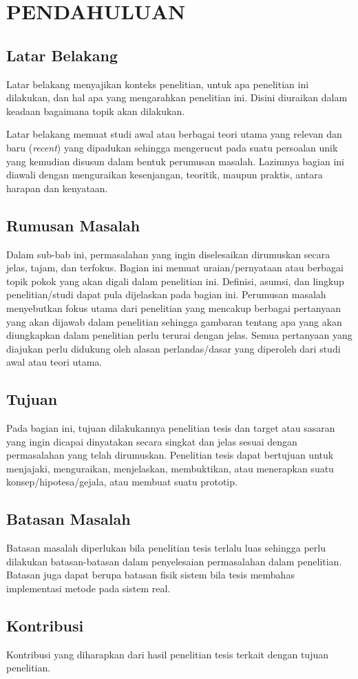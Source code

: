 \chapter{PENDAHULUAN}

\section{Latar Belakang}

Latar belakang menyajikan konteks penelitian, untuk apa penelitian ini dilakukan, dan hal apa yang mengarahkan penelitian ini. Disini diuraikan dalam keadaan bagaimana topik akan dilakukan.

Latar belakang memuat studi awal atau berbagai teori utama yang relevan dan baru (\emph{recent}) yang dipadukan sehingga mengerucut pada suatu persoalan unik yang kemudian disusun dalam bentuk perumusan masalah. Lazimnya bagian ini diawali dengan menguraikan kesenjangan, teoritik, maupun praktis, antara harapan dan kenyataan.

\section{Rumusan Masalah}

Dalam sub-bab ini, permasalahan yang ingin diselesaikan dirumuskan secara jelas, tajam, dan terfokus. Bagian ini memuat uraian/pernyataan atau berbagai topik pokok yang akan digali dalam penelitian ini. Definisi, asumsi, dan lingkup penelitian/studi dapat pula dijelaskan pada bagian ini. Perumusan masalah menyebutkan fokus utama dari penelitian yang mencakup berbagai pertanyaan yang akan dijawab dalam penelitian sehingga gambaran tentang apa yang akan diungkapkan dalam penelitian perlu terurai dengan jelas. Semua pertanyaan yang diajukan perlu didukung oleh alasan perlandas/dasar yang diperoleh dari studi awal atau teori utama.

\section{Tujuan}

Pada bagian ini, tujuan dilakukannya penelitian tesis dan target atau sasaran yang ingin dicapai dinyatakan secara singkat dan jelas sesuai dengan permasalahan yang telah dirumuskan. Penelitian tesis dapat bertujuan untuk menjajaki, menguraikan, menjelaskan, membuktikan, atau menerapkan suatu konsep/hipotesa/gejala, atau membuat suatu prototip.

\section{Batasan Masalah}

Batasan masalah diperlukan bila penelitian tesis terlalu luas sehingga perlu dilakukan batasan-batasan dalam penyelesaian permasalahan dalam penelitian. Batasan juga dapat berupa batasan fisik sistem bila tesis membahas implementasi metode pada sistem real.

\section{Kontribusi}
Kontribusi yang diharapkan dari hasil penelitian tesis terkait dengan tujuan penelitian.
